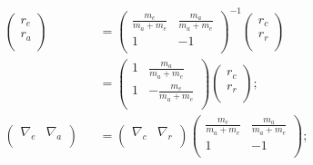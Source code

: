 \documentclass[11pt,a4paper]{jsarticle}
\begin{document}
\begin{eqnarray}
\left( \begin{array}{cc} r_e\\ r_a\\ \end{array} \right) &&= \left(\begin{array}{cc} \frac{m_e}{m_a + m_e} & \frac{m_a}{m_a + m_e} \\ 1 & -1 \\ \end{array} \right)^{-1} \left( \begin{array}{cc} r_c\\ r_r\\ \end{array} \right)\\
&&= \left(\begin{array}{cc} 1 & \frac{m_a}{m_a + m_e} \\ 1 & -\frac{m_e}{m_a + m_e} \\ \end{array} \right) \left( \begin{array}{cc} r_c\\ r_r\\ \end{array} \right);\\
\left( \begin{array}{cc} \nabla_e & \nabla_a\\ \end{array} \right) &&= \left( \begin{array}{cc} \nabla_c & \nabla_r\\ \end{array} \right) \left(\begin{array}{cc} \frac{m_e}{m_a + m_e} & \frac{m_a}{m_a + m_e} \\ 1 & -1 \\ \end{array} \right) ;\\

\end{eqnarray}
\end{document}
